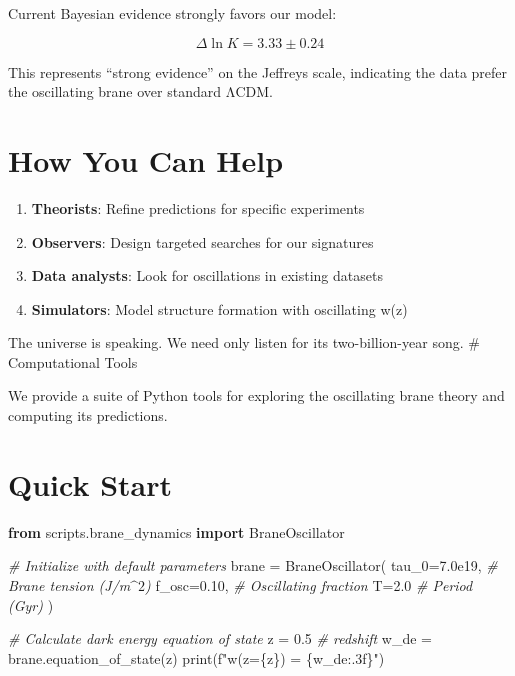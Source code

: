 \documentclass[
  11pt,
]{report}
\newenvironment{Shaded}{}{}
\newcommand{\BuiltInTok}[1]{\textcolor[rgb]{0.00,0.50,0.00}{#1}}
\newcommand{\CommentTok}[1]{\textcolor[rgb]{0.38,0.63,0.69}{\textit{#1}}}
\newcommand{\FloatTok}[1]{\textcolor[rgb]{0.25,0.63,0.44}{#1}}
\newcommand{\ImportTok}[1]{\textcolor[rgb]{0.00,0.50,0.00}{\textbf{#1}}}
\newcommand{\NormalTok}[1]{#1}
\newcommand{\OperatorTok}[1]{\textcolor[rgb]{0.40,0.40,0.40}{#1}}
\newcommand{\SpecialCharTok}[1]{\textcolor[rgb]{0.25,0.44,0.63}{#1}}
\newcommand{\SpecialStringTok}[1]{\textcolor[rgb]{0.73,0.40,0.53}{#1}}
\providecommand{\tightlist}{%
  \setlength{\itemsep}{0pt}\setlength{\parskip}{0pt}}
\begin{document}
Current Bayesian evidence strongly favors our model:

\[\Delta \ln K = 3.33 ± 0.24\]

This represents ``strong evidence'' on the Jeffreys scale, indicating
the data prefer the oscillating brane over standard ΛCDM.

\section{How You Can Help}\label{how-you-can-help}

\begin{enumerate}
\def\labelenumi{\arabic{enumi}.}
\tightlist
\item
  \textbf{Theorists}: Refine predictions for specific experiments
\item
  \textbf{Observers}: Design targeted searches for our signatures
\item
  \textbf{Data analysts}: Look for oscillations in existing datasets
\item
  \textbf{Simulators}: Model structure formation with oscillating w(z)
\end{enumerate}

The universe is speaking. We need only listen for its two-billion-year
song. \newpage \# Computational Tools

We provide a suite of Python tools for exploring the oscillating brane
theory and computing its predictions.

\section{Quick Start}\label{quick-start}

\begin{Shaded}
\begin{Highlighting}[]
\ImportTok{from}\NormalTok{ scripts.brane\_dynamics }\ImportTok{import}\NormalTok{ BraneOscillator}

\CommentTok{\# Initialize with default parameters}
\NormalTok{brane }\OperatorTok{=}\NormalTok{ BraneOscillator(}
\NormalTok{    tau\_0}\OperatorTok{=}\FloatTok{7.0e19}\NormalTok{,  }\CommentTok{\# Brane tension (J/m$\^{}2$)}
\NormalTok{    f\_osc}\OperatorTok{=}\FloatTok{0.10}\NormalTok{,    }\CommentTok{\# Oscillating fraction}
\NormalTok{    T}\OperatorTok{=}\FloatTok{2.0}          \CommentTok{\# Period (Gyr)}
\NormalTok{)}

\CommentTok{\# Calculate dark energy equation of state}
\NormalTok{z }\OperatorTok{=} \FloatTok{0.5}  \CommentTok{\# redshift}
\NormalTok{w\_de }\OperatorTok{=}\NormalTok{ brane.equation\_of\_state(z)}
\BuiltInTok{print}\NormalTok{(}\SpecialStringTok{f"w(z=}\SpecialCharTok{\{}\NormalTok{z}\SpecialCharTok{\}}\SpecialStringTok{) = }\SpecialCharTok{\{}\NormalTok{w\_de}\SpecialCharTok{:.3f\}}\SpecialStringTok{"}\NormalTok{)}
\end{Highlighting}
\end{Shaded}
\end{document}
